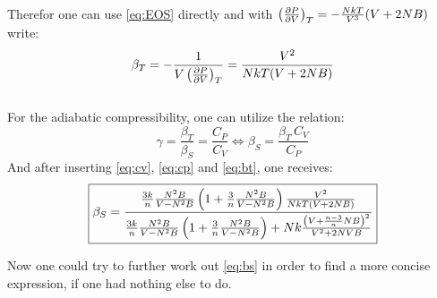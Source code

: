 \documentclass[11pt,a4paper]{scrartcl}
\newcommand{\thermpart}[3]{\left(\pdv{#1}{#2}\right)_{#3}}
\begin{document}
\begin{enumerate}[label=\textbf{\large(\alph*)}, itemsep=2\baselineskip]
    Therefor one can use \eqref{eq:EOS} directly and with
    $\thermpart{P}{V}{T}=-\frac{NkT}{V^3}(V+2NB)$ write:
    \begin{equation}
        \beta_{T}=-\frac{1}{V\thermpart{P}{V}{T}}=\frac{V^2}{NkT(V+2NB)}
        \label{eq:bt}
    \end{equation} \\

    For the adiabatic compressibility, one can utilize the relation:
    \begin{equation*}
        \gamma=\frac{\beta_{T}}{\beta_{S}}=\frac{C_{P}}{C_{V}}\iff\beta_{S}=\frac{\beta_{T}\,C_{V}}{C_{P}}
    \end{equation*}
    And after inserting \eqref{eq:cv}, \eqref{eq:cp} and \eqref{eq:bt}, one
    receives:
    \begin{equation}
        \boxed{%
        \beta_{S}=\frac{\frac{3k}{n}\frac{N^2B}{V-N^2B}\left(1+\frac{3}{n}\frac{N^2B}{V-N^2B}\right)\frac{V^2}{NkT(V+2NB)}}
        {\frac{3k}{n}\frac{N^2B}{V-N^2B}\left(1+\frac{3}{n}\frac{N^2B}{V-N^2B}\right)+Nk\frac{\left(V+\frac{n-3}{n}NB\right)^2}{V^2+2NVB}}
        }
        \label{eq:bs}
    \end{equation}

    Now one could try to further work out \eqref{eq:bs} in order to find a more
    concise expression, if one had nothing else to do.

\end{enumerate}
\end{document}
